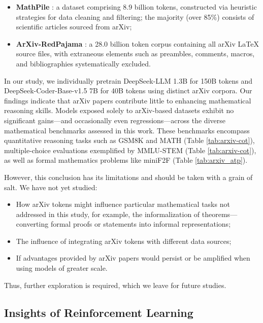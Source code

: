 \begin{itemize}[topsep=0pt]
\begin{itemize}[topsep=0pt]
\begin{itemize}[topsep=0pt]
    \item \textbf{MathPile} \citep{mathpile}: a dataset comprising 8.9 billion tokens, constructed via heuristic strategies for data cleaning and filtering; the majority (over 85\%) consists of scientific articles sourced from arXiv;
    \item \textbf{ArXiv-RedPajama} \citep{redpajama}: a 28.0 billion token corpus containing all arXiv LaTeX source files, with extraneous elements such as preambles, comments, macros, and bibliographies systematically excluded.
\end{itemize}

In our study, we individually pretrain DeepSeek-LLM 1.3B for 150B tokens and DeepSeek-Coder-Base-v1.5 7B for 40B tokens using distinct arXiv corpora. Our findings indicate that arXiv papers contribute little to enhancing mathematical reasoning skills. Models exposed solely to arXiv-based datasets exhibit no significant gains—and occasionally even regressions—across the diverse mathematical benchmarks assessed in this work. These benchmarks encompass quantitative reasoning tasks such as GSM8K and MATH (Table \ref{tab:arxiv-cot}), multiple-choice evaluations exemplified by MMLU-STEM (Table \ref{tab:arxiv-cot}), as well as formal mathematics problems like miniF2F (Table \ref{tab:arxiv_atp}).

However, this conclusion has its limitations and should be taken with a grain of salt. We have not yet studied:

\begin{itemize}[topsep=0pt]
    \item How arXiv tokens might influence particular mathematical tasks not addressed in this study, for example, the informalization of theorems—converting formal proofs or statements into informal representations;
    \item The influence of integrating arXiv tokens with different data sources;
    \item If advantages provided by arXiv papers would persist or be amplified when using models of greater scale.
\end{itemize}

Thus, further exploration is required, which we leave for future studies.

\subsection{Insights of Reinforcement Learning}

\end{itemize}
\end{itemize}
